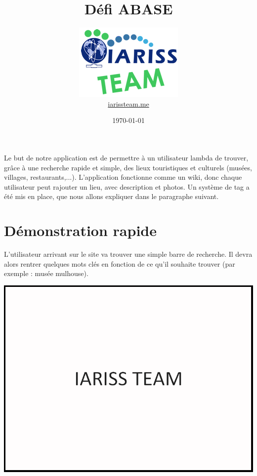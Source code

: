 \documentclass[12pt, a4paper]{article}
\title{Défi ABASE}
\newcommand{\espace}{\vspace{.8cm}}
\begin{document}
\author{\includegraphics{../_img/iariss_team.png} \\ {\sffamily \href{http://iarissteam.me}{iarissteam.me}}}
\date{\today}

\maketitle{}

{\sffamily Le but de notre application est de permettre à un utilisateur lambda de trouver, grâce à une recherche rapide et simple, des lieux touristiques et culturels (musées, villages, restaurants,...). L'application fonctionne comme un wiki, donc chaque utilisateur peut rajouter un lieu, avec description et photos. Un système de tag a été mis en place, que nous allons expliquer dans le paragraphe suivant.} 

\espace{}
\section{Démonstration rapide}
L'utilisateur arrivant sur le site va trouver une simple barre de recherche. Il devra alors rentrer quelques mots clés en fonction de ce qu'il souhaite trouver (par exemple : \og{}musée mulhouse\fg{}).

\espace{}
\includegraphics[width=.9\textwidth, keepaspectratio=true]{img/test.png}
\end{document}
